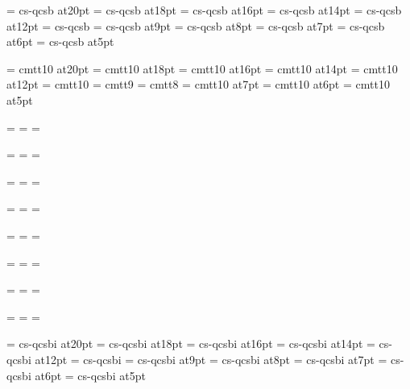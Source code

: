 \font\twentybf=     cs-qcsb at20pt
\font\eighteenbf=   cs-qcsb at18pt
\font\sixteenbf=    cs-qcsb at16pt
\font\fourteenbf=   cs-qcsb at14pt
\font\twelvebf=     cs-qcsb at12pt
\font\tenbf=        cs-qcsb
\font\ninebf=       cs-qcsb at9pt
\font\eightbf=      cs-qcsb at8pt
\font\sevenbf=      cs-qcsb at7pt
\font\sixbf=        cs-qcsb at6pt
\font\fivebf=       cs-qcsb at5pt

\font\twentytt=     cmtt10 at20pt
\font\eighteentt=   cmtt10 at18pt
\font\sixteentt=    cmtt10 at16pt
\font\fourteentt=   cmtt10 at14pt
\font\twelvett=     cmtt10 at12pt
\font\tentt=        cmtt10
\font\ninett=       cmtt9
\font\eighttt=      cmtt8
\font\seventt=      cmtt10 at7pt
\font\sixtt=        cmtt10 at6pt
\font\fivett=       cmtt10 at5pt




=\tenrm
{}=\sevenrm
{}=\fiverm
\def\rm{\fam=0 \tenrm}

=\teni
{}=\seveni
{}=\fivei
\def\mit{\fam=1}

=\tensy
{}=\sevensy
{}=\fivesy
\def\cal{\fam=2}

=\tenex
{}=\sevenex
{}=\fiveex


\def\it{\fam=\itfam \tenit}
\textfont\itfam=\tenit
\scriptfont\itfam=\sevenit
\scriptscriptfont\itfam=\fiveit

\def\sl{\fam=\slfam \tensl}
\textfont\slfam=\tensl
\scriptfont\slfam=\sevensl
\scriptscriptfont\slfam=\fivesl

\def\bf{\fam=\bffam \tenbf}
\textfont\bffam=\tenbf
\scriptfont\bffam=\sevenbf
\scriptscriptfont\bffam=\fivebf

\def\tt{\fam=\ttfam \tentt}
\textfont\ttfam=\tentt
\scriptfont\ttfam=\seventt
\scriptscriptfont\ttfam=\fivett

\font\twentyitbf=      cs-qcsbi at20pt
\font\eighteenitbf=    cs-qcsbi at18pt
\font\sixteenitbf=     cs-qcsbi at16pt
\font\fourteenitbf=    cs-qcsbi at14pt
\font\twelveitbf=      cs-qcsbi at12pt
\font\itbf=            cs-qcsbi
\font\nineitbf=        cs-qcsbi at9pt
\font\eightitbf=       cs-qcsbi at8pt
\font\sevenitbf=       cs-qcsbi at7pt
\font\sixitbf=         cs-qcsbi at6pt
\font\fiveitbf=        cs-qcsbi at5pt

